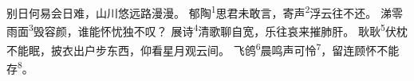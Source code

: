 
\begin{poem}
别日何易会日难，山川悠远路漫漫。
郁陶\textsuperscript{1}思君未敢言，寄声\textsuperscript{2}浮云往不还。
涕零雨面\textsuperscript{3}毁容颜，谁能怀忧独不叹？
展诗\textsuperscript{4}清歌聊自宽，乐往哀来摧肺肝。
耿耿\textsuperscript{5}伏枕不能眠，披衣出户步东西，仰看星月观云间。
飞鸧\textsuperscript{6}晨鸣声可怜\textsuperscript{7}，留连顾怀不能存\textsuperscript{8}。
\end{poem}

\begin{annotations}
\end{annotations}

